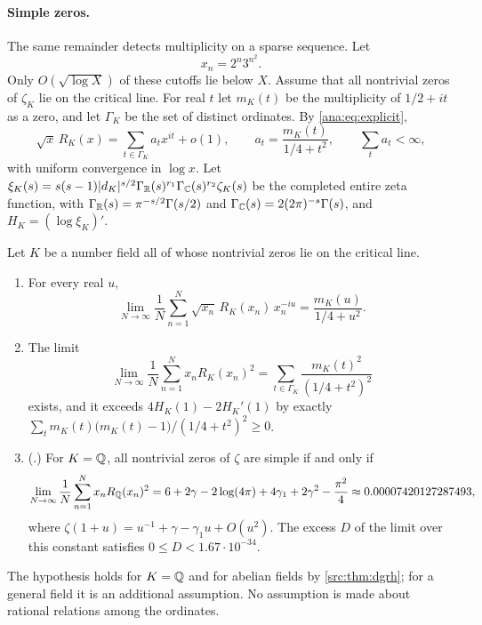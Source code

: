 \paragraph{Simple zeros.}
The same remainder detects multiplicity on a sparse sequence. Let
\[
 x_n=2^n3^{n^2}.
\]
Only $O(\sqrt{\log X})$ of these cutoffs lie below $X$. Assume that all nontrivial zeros of
$\zeta_K$ lie on the critical line. For real $t$ let $m_K(t)$ be the multiplicity of $1/2+it$
as a zero, and let $\Gamma_K$ be the set of distinct ordinates. By \eqref{ana:eq:explicit},
\begin{equation}\label{ana:eq:apseries}
 \sqrt x\,R_K(x)=\sum_{t\in\Gamma_K}a_tx^{it}+o(1),\qquad
 a_t=\frac{m_K(t)}{1/4+t^2},\qquad\sum_ta_t<\infty,
\end{equation}
with uniform convergence in $\log x$. Let $\xi_K(s)=s(s-1)\lvert d_K\rvert^{s/2}
\Gamma_{\mathbb{R}}(s)^{r_1}\Gamma_{\mathbb{C}}(s)^{r_2}\zeta_K(s)$ be the completed entire zeta function, with
$\Gamma_{\mathbb{R}}(s)=\pi^{-s/2}\Gamma(s/2)$ and $\Gamma_{\mathbb{C}}(s)=2(2\pi)^{-s}\Gamma(s)$, and
$H_K=(\log\xi_K)'$.

\begin{theorem}\label{ana:thm:simple}
Let $K$ be a number field all of whose nontrivial zeros lie on the critical line.
\begin{enumerate}[label=\textup{(\roman*)}]
\item For every real $u$,
 \[
  \lim_{N\to\infty}\frac1N\sum_{n=1}^N\sqrt{x_n}\,R_K(x_n)\,x_n^{-iu}=\frac{m_K(u)}{1/4+u^2}.
 \]
\item The limit
 \[
  \lim_{N\to\infty}\frac1N\sum_{n=1}^Nx_nR_K(x_n)^2
  =\sum_{t\in\Gamma_K}\frac{m_K(t)^2}{(1/4+t^2)^2}
 \]
 exists, and it exceeds $4H_K(1)-2H_K'(1)$ by exactly
 $\sum_{t}m_K(t)\bigl(m_K(t)-1\bigr)/(1/4+t^2)^2\ge0$.
\item \textup{(\stG.)} For $K=\mathbb{Q}$, all nontrivial zeros of $\zeta$ are simple if and only if
 \[
  \lim_{N\to\infty}\frac1N\sum_{n=1}^Nx_nR_{\mathbb{Q}}(x_n)^2
  =6+2\gamma-2\log(4\pi)+4\gamma_1+2\gamma^2-\frac{\pi^2}4\approx0.00007420127287493 ,
 \]
 where $\zeta(1+u)=u^{-1}+\gamma-\gamma_1u+O(u^2)$. The excess $D$ of the limit over this
 constant satisfies $0\le D<1.67\cdot10^{-34}$.
\end{enumerate}
\end{theorem}

The hypothesis holds for $K=\mathbb{Q}$ and for abelian fields by \cref{src:thm:dgrh}; for a general
field it is an additional assumption. No assumption is made about rational relations among
the ordinates.

